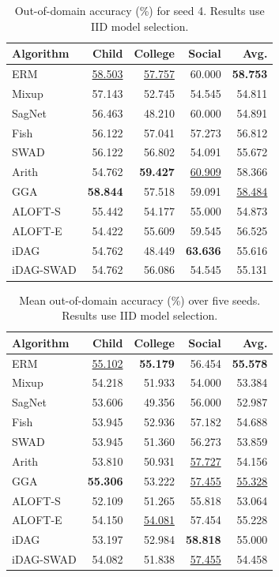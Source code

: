 \documentclass[10pt]{article}
\begin{document}
\begin{table}[H]
  \centering
  \caption{Out-of-domain accuracy (\%) for seed 4. Results use IID model selection.}
  \label{tab:seed-4}
  \begin{tabular}{lrrrr}
    \toprule
    Algorithm & Child & College & Social & Avg. \\
    \midrule
    ERM & \underline{58.503} & \underline{57.757} & 60.000 & \textbf{58.753} \\
    Mixup & 57.143 & 52.745 & 54.545 & 54.811 \\
    SagNet & 56.463 & 48.210 & 60.000 & 54.891 \\
    Fish & 56.122 & 57.041 & 57.273 & 56.812 \\
    SWAD & 56.122 & 56.802 & 54.091 & 55.672 \\
    Arith & 54.762 & \textbf{59.427} & \underline{60.909} & 58.366 \\
    GGA & \textbf{58.844} & 57.518 & 59.091 & \underline{58.484} \\
    ALOFT-S & 55.442 & 54.177 & 55.000 & 54.873 \\
    ALOFT-E & 54.422 & 55.609 & 59.545 & 56.525 \\
    iDAG & 54.762 & 48.449 & \textbf{63.636} & 55.616 \\
    iDAG-SWAD & 54.762 & 56.086 & 54.545 & 55.131 \\
    \bottomrule
  \end{tabular}
\end{table}
\begin{table}[H]
  \centering
  \caption{Mean out-of-domain accuracy (\%) over five seeds. Results use IID model selection.}
  \label{tab:five-seed-mean}
  \begin{tabular}{lrrrr}
    \toprule
    Algorithm & Child & College & Social & Avg. \\
    \midrule
    ERM & \underline{55.102} & \textbf{55.179} & 56.454 & \textbf{55.578} \\
    Mixup & 54.218 & 51.933 & 54.000 & 53.384 \\
    SagNet & 53.606 & 49.356 & 56.000 & 52.987 \\
    Fish & 53.945 & 52.936 & 57.182 & 54.688 \\
    SWAD & 53.945 & 51.360 & 56.273 & 53.859 \\
    Arith & 53.810 & 50.931 & \underline{57.727} & 54.156 \\
    GGA & \textbf{55.306} & 53.222 & \underline{57.455} & \underline{55.328} \\
    ALOFT-S & 52.109 & 51.265 & 55.818 & 53.064 \\
    ALOFT-E & 54.150 & \underline{54.081} & 57.454 & 55.228 \\
    iDAG & 53.197 & 52.984 & \textbf{58.818} & 55.000 \\
    iDAG-SWAD & 54.082 & 51.838 & \underline{57.455} & 54.458 \\
    \bottomrule
  \end{tabular}
\end{table}
\end{document}
